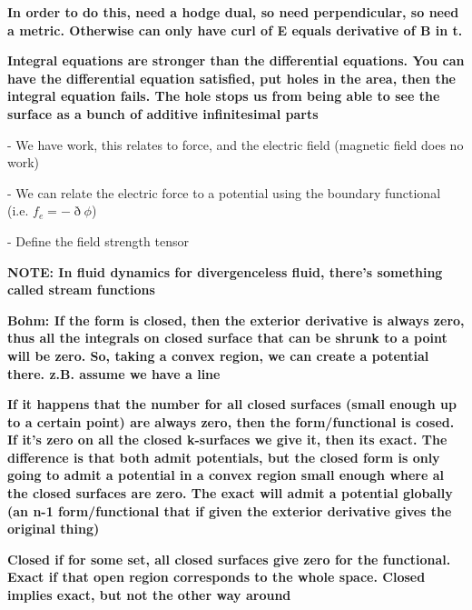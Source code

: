 \documentclass{book}
\begin{document}
\textbf{In order to do this, need a hodge dual, so need perpendicular, so need a metric. Otherwise can only have curl of E equals derivative of B in t. }

\textbf{Integral equations are stronger than the differential equations. You can have the differential equation satisfied, put holes in the area, then the integral equation fails. The hole stops us from being able to see the surface as a bunch of additive infinitesimal parts}

- We have work, this relates to force, and the electric field (magnetic field does no work)

- We can relate the electric force to a potential using the boundary functional (i.e. $f_e = -\eth\phi$)

- Define the field strength tensor


\textbf{NOTE: In fluid dynamics for divergenceless fluid, there's something called stream functions}

\textbf{Bohm: If the form is closed, then the exterior derivative is always zero, thus all the integrals on closed surface that can be shrunk to a point will be zero. So, taking a convex region, we can create a potential there. z.B. assume we have a line}

\textbf{If it happens that the number for all closed surfaces (small enough up to a certain point) are always zero, then the form/functional is cosed. If it's zero on all the closed k-surfaces we give it, then its exact. The difference is that both admit potentials, but the closed form is only going to admit a potential in a convex region small enough where al the closed surfaces are zero. The exact will admit a potential globally (an n-1 form/functional that if given the exterior derivative gives the original thing)}

\textbf{Closed if for some set, all closed surfaces give zero for the functional. Exact if that open region corresponds to the whole space. Closed implies exact, but not the other way around}
\end{document}
